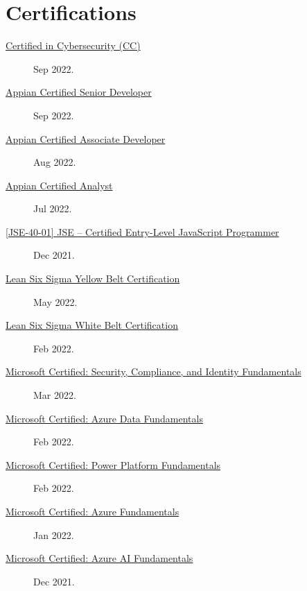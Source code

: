 \documentclass{article}
\begin{document}
\section*{Certifications}\vspace{-0.5em}
\begin{description}
  \item [\href{https://www.credly.com/badges/f0aab7ce-2f5d-4569-8705-3dc23fc34200/public_url}{Certified in Cybersecurity (CC)}] Sep 2022.
  \item [\href{https://community.appian.com/members/alexanderk7594?badge=cert&now=637997122455046997}{Appian Certified Senior Developer}] Sep 2022.
  \item [\href{https://community.appian.com/members/alexanderk7594?badge=cert&now=637997122455046997}{Appian Certified Associate Developer}] Aug 2022.
  \item [\href{https://community.appian.com/members/alexanderk7594?badge=cert&now=637997122455046997}{Appian Certified Analyst}] Jul 2022.
  \item [\href{https://www.credly.com/badges/e75210e4-8d08-43ea-af72-ec70ef666eee/public_url}{[JSE-40-01] JSE – Certified Entry-Level JavaScript Programmer}] Dec 2021.
  \item [\href{https://api.badgr.io/public/assertions/KE5P9gfoQ7S3-hpvZP4PIQ}{Lean Six Sigma Yellow Belt Certification}] May 2022.
  \item [\href{https://api.badgr.io/public/assertions/JhPP0s2rQWWGrc9ZkYqhkg}{Lean Six Sigma White Belt Certification}] Feb 2022.
  \item [\href{https://www.credly.com/badges/606ab01b-911d-4408-a6a8-303b121d4fc8/public_url}{Microsoft Certified: Security, Compliance, and Identity Fundamentals}] Mar 2022.
  \item [\href{https://www.credly.com/badges/677cac34-dc29-4535-ba97-6d4c81ccf19e/public_url}{Microsoft Certified: Azure Data Fundamentals}] Feb 2022.
  \item [\href{https://www.credly.com/badges/eeabb8f3-4c51-431e-9174-1528f4ecd6d3/public_url}{Microsoft Certified: Power Platform Fundamentals}] Feb 2022.
  \item [\href{https://www.credly.com/badges/56339905-a587-4fdb-9906-c2d2bb5d31da/public_url}{Microsoft Certified: Azure Fundamentals}] Jan 2022.
  \item [\href{https://www.credly.com/badges/fa66cf6b-dff5-4f58-9f4e-4b94fc91b7fa/public_url}{Microsoft Certified: Azure AI Fundamentals}] Dec 2021.
\end{description}
\end{document}
